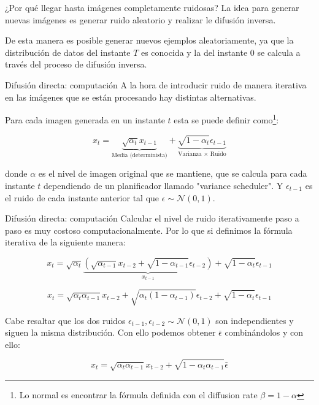 \begin{frame}{¿Por qué llegar hasta imágenes completamente ruidosas?}
La idea para generar \alert{nuevas imágenes} es generar \alert{ruido aleatorio} y realizar le difusión inversa.

De esta manera es posible generar \alert{nuevos ejemplos} aleatoriamente, ya que la distribución de datos del instante \alert{$T$} es conocida y la del instante \alert{$0$} se calcula a través del proceso de difusión inversa.
\end{frame}

\begin{frame}{Difusión directa: computación}
A la hora de introducir ruido de manera \alert{iterativa} en las imágenes que se están procesando hay distintas alternativas.

Para cada imagen generada en un instante $t$ esta se puede definir como\footnote{Lo normal es encontrar la fórmula definida con el diffusion rate $\beta = 1-\alpha$}:

\begin{equation}
    x_t = \underbrace{\sqrt{\alpha_t} x_{t-1}}_{\text{Media (determinista)}} + \underbrace{\sqrt{1 - \alpha_t} \epsilon_{t-1}}_{\text{Varianza } \times \text{ Ruido}}
\end{equation}

donde $\alpha$ es el nivel de imagen original que se mantiene, que se calcula para cada instante $t$ dependiendo de un planificador llamado "\alert{variance scheduler}". Y $\epsilon_{t-1}$ es el ruido de cada instante anterior tal que \alert{$\epsilon \sim \mathcal{N}(0,1)$}.
\end{frame}

\begin{frame}{Difusión directa: computación}
Calcular el nivel de ruido iterativamente paso a paso es \alert{muy costoso computacionalmente}. Por lo que si definimos la fórmula iterativa de la siguiente manera:

\begin{equation}
x_t = \sqrt{\alpha_t} \underbrace{\left( \sqrt{\alpha_{t-1}} x_{t-2} + \sqrt{1 - \alpha_{t-1}} \epsilon_{t-2} \right)}_{x_{t-1}} + \sqrt{1 - \alpha_t} \epsilon_{t-1}
\end{equation}

\begin{equation}
x_t = \sqrt{\alpha_t \alpha_{t-1}} x_{t-2} + \sqrt{\alpha_t (1 - \alpha_{t-1})} \epsilon_{t-2} + \sqrt{1 - \alpha_t} \epsilon_{t-1}
\end{equation}

Cabe resaltar que los dos ruidos $\epsilon_{t-1}, \epsilon_{t-2}\sim \mathcal{N}(0,1)$ son \alert{independientes} y siguen la \alert{misma distribución}. Con ello podemos obtener $\bar{\epsilon}$ combinándolos y con ello:

\begin{equation}
x_t = \sqrt{\alpha_t \alpha_{t-1}} x_{t-2} + \sqrt{1 - \alpha_t \alpha_{t-1}} \bar{\epsilon}
\end{equation}
\end{frame}

